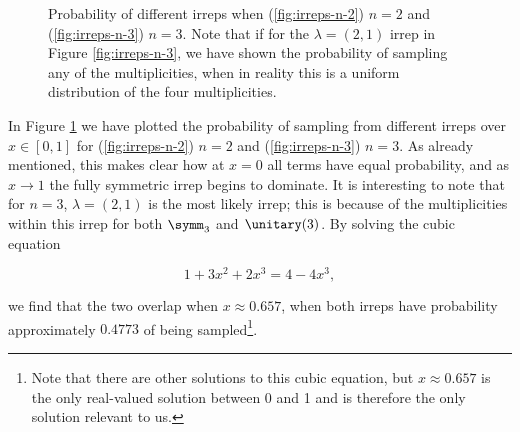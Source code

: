 \begin{figure}
\hfill
{}
\caption[Probability of different irreps when $n=2$ and $n=3$.]{\label{fig:irreps} Probability of different irreps when (\ref{fig:irreps-n-2}) $n=2$ and (\ref{fig:irreps-n-3}) $n=3$. Note that if for the $\lambda=(2,1)$ irrep in Figure \ref{fig:irreps-n-3}, we have shown the probability of sampling any of the multiplicities, when in reality this is a uniform distribution of the four multiplicities.}
\end{figure}

In Figure \ref{fig:irreps} we have plotted the probability of sampling from different irreps over $x \in [0,1]$ for (\ref{fig:irreps-n-2}) $n=2$ and (\ref{fig:irreps-n-3}) $n=3$. As already mentioned, this makes clear how at $x=0$ all terms have equal probability, and as $x\rightarrow 1$ the fully symmetric irrep begins to dominate. It is interesting to note that for $n=3$, $\lambda=(2,1)$ is the most likely irrep; this is because of the multiplicities within this irrep for both $\symm_3$ and $\unitary(3)$. By solving the cubic equation

\begin{equation}
1+3x^2+2x^3 = 4-4x^3,
\end{equation}

\noindent we find that the two overlap when $x \approx 0.657$, when both irreps have probability approximately $0.4773$ of being sampled\footnote{Note that there are other solutions to this cubic equation, but $x\approx 0.657$ is the only real-valued solution between 0 and 1 and is therefore the only solution relevant to us.}.


